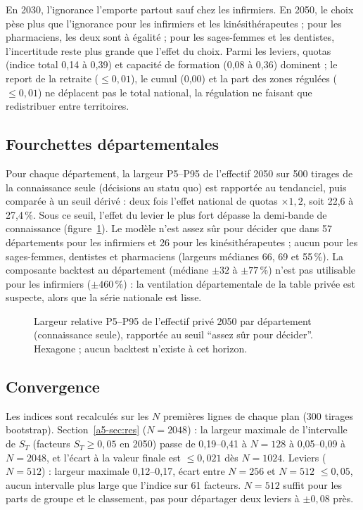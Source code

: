 En 2030, l'ignorance l'emporte partout sauf chez les infirmiers. En 2050, le choix pèse plus que l'ignorance pour
les infirmiers et les kinésithérapeutes ; pour les pharmaciens, les deux sont à égalité ; pour les sages-femmes et
les dentistes, l'incertitude reste plus grande que l'effet du choix. Parmi les leviers, quotas (indice total 0,14 à
0,39\mesure{}) et capacité de formation (0,08 à 0,36\mesure{}) dominent ; le report de la retraite ($\le 0{,}01$),
le cumul (0,00) et la part des zones régulées ($\le 0{,}01$\mesure{}) ne déplacent pas le total national, la
régulation ne faisant que redistribuer entre territoires.

\subsection{Fourchettes départementales}
Pour chaque département, la largeur P5--P95 de l'effectif 2050 sur 500 tirages de la connaissance seule (décisions au
statu quo) est rapportée au tendanciel, puis comparée à un seuil dérivé : deux fois l'effet national de quotas
$\times 1{,}2$, soit 22,6 à 27,4\,\%\derive{}. Sous ce seuil, l'effet du levier le plus fort dépasse la demi-bande
de connaissance (figure~\ref{a5-fig:carte}). Le modèle n'est assez sûr pour décider que dans 57\mesure{} départements
pour les infirmiers et 26\mesure{} pour les kinésithérapeutes ; aucun pour les sages-femmes, dentistes et
pharmaciens (largeurs médianes 66, 69 et 55\,\%\mesure{}). La composante backtest au département (médiane $\pm 32$ à
$\pm 77$\,\%\derive{}) n'est pas utilisable pour les infirmiers ($\pm 460$\,\%\derive{}) : la ventilation
départementale de la table privée est suspecte, alors que la série nationale est lisse.

\begin{figure}[h]\centering
\resizebox{\textwidth}{!}{}
\caption{Largeur relative P5--P95 de l'effectif privé 2050 par département (connaissance seule), rapportée au seuil
\enquote{assez sûr pour décider}. Hexagone ; aucun backtest n'existe à cet horizon.}\label{a5-fig:carte}
\end{figure}

\subsection{Convergence}
Les indices sont recalculés sur les $N$ premières lignes de chaque plan (300 tirages bootstrap). Section~\ref{a5-sec:res}
($N = 2048$) : la largeur maximale de l'intervalle de $S_T$ (facteurs $S_T \ge 0{,}05$ en 2050) passe de 0,19--0,41 à
$N = 128$ à 0,05--0,09\mesure{} à $N = 2048$, et l'écart à la valeur finale est $\le 0{,}021$\mesure{} dès
$N = 1024$. Leviers ($N = 512$) : largeur maximale 0,12--0,17\mesure{}, écart entre $N = 256$ et $N = 512$
$\le 0{,}05$\mesure{}, aucun intervalle plus large que l'indice sur 61 facteurs. $N = 512$ suffit pour les parts de
groupe et le classement, pas pour départager deux leviers à $\pm 0{,}08$ près.

